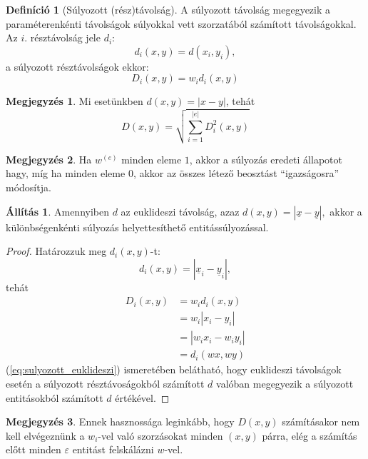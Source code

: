 \documentclass{article}
\theoremstyle{definition}
\newtheorem{definition}{Definíció}[section]
\newtheorem{allitas}{Állítás}[section]
\newtheorem*{megj}{Megjegyzés}
\newcommand{\vect}[1]{ \underline{#1} }
\newcommand{\ent}[2]{ {#1}^{(#2)} }
\begin{document}
\begin{multicols}{2}
    \begin{definition}[Súlyozott (rész)távolság]
        A súlyozott távolság megegyezik a paraméterenkénti távolságok súlyokkal vett szorzatából számított távolságokkal. Az $i.$ résztávolság jele $d_i$:
        \begin{equation}
            d_i(x, y) = d(x_i, y_i),
        \end{equation}
        a súlyozott résztávolságok ekkor:
        \begin{equation}
            D_{i}(x, y) = w_id_i(x, y)
        \end{equation}
        \begin{megj}
            Mi esetünkben $d(x, y) = |x-y|$, tehát
            \begin{equation}\label{eq:sulyozott_euklideszi}
                D(x, y) = \sqrt{\sum_{i=1}^{|e|} D_i^2(x, y)} 
            \end{equation}
        \end{megj}
    \end{definition}
    
    \begin{megj}
        Ha $\ent w e$ minden eleme $1$, akkor a súlyozás eredeti állapotot hagy, míg ha minden eleme $0$, akkor az összes létező beosztást \enquote{igazságosra} módosítja.
    \end{megj}
    
    \begin{allitas}
        Amennyiben $d$ az euklideszi távolság, azaz $d(x,y) = |\vect x - \vect y|,$ akkor a különbségenkénti súlyozás helyettesíthető entitássúlyozással.
        \begin{proof}
            Határozzuk meg $d_i(x, y)$-t:
            \begin{equation}
                d_i(x,y) = |\vect x_i - \vect y_i|,
            \end{equation}
            tehát
            \begin{equation}
            \begin{split}
                D_i(x, y) &= w_i d_i(x, y) \\
                &= w_i |x_i - y_i| \\
                &= |w_i x_i - w_i y_i| \\
                &= d_i(wx, wy)
            \end{split}
            \end{equation}
            (\ref{eq:sulyozott_euklideszi}) ismeretében belátható, hogy euklideszi távolságok esetén a súlyozott résztávoságokból számított $d$ valóban megegyezik a súlyozott entitásokból számított $d$ értékével.
        \end{proof}
        \begin{megj}
            Ennek hasznossága leginkább, hogy $D(x, y)$ számításakor nem kell elvégeznünk a $w_i$-vel való szorzásokat minden $(x,y)$ párra, elég a számítás előtt minden $\varepsilon$ entitást felskálázni $w$-vel.
        \end{megj}
    \end{allitas}
    

\end{multicols}
\end{document}
